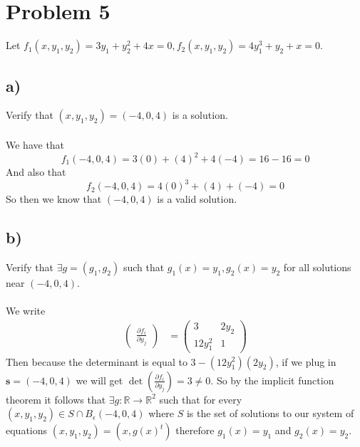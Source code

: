 \documentclass{article}
\theoremstyle{definition}
\begin{document}
\section*{Problem 5}
\begin{mdframed}[]
    Let $f_1(x,y_1,y_2) = 3y_1 +y_2^2 +4x = 0, f_2( x , y_1 , y_2 ) = 4 y^3_1 + y_2 + x = 0$.
\end{mdframed}
\subsection*{a)}
Verify that $(x,y_1,y_2) = (-4,0,4)$ is a solution.\\\\
We have that 
\[
    f_1(-4,0,4) = 3(0) + (4)^2 + 4(-4) = 16 - 16 = 0
\]
And also that 
\[
    f_2(-4,0,4) = 4(0)^3 + (4) + (-4) = 0
    \]
    So then we know that $(-4,0,4)$ is a valid solution.
\subsection*{b)}
Verify that $\exists g = (g_1,g_2)$ such that $g_1(x) = y_1, g_2(x) = y_2$ for all solutions near $(-4,0,4)$.\\\\
We write 
\begin{align*}
    \begin{pmatrix}
        \frac{\partial f_i}{\partial y_j}
    \end{pmatrix} & = \begin{pmatrix}
        3 & 2y_2\\
        12y_1^2 & 1
    \end{pmatrix}
\end{align*}
Then because the determinant is equal to $3 - (12y_1^2)(2y_2)$, if we plug in $\bm s = (-4, 0 ,4)$
we will get $\det\left(\frac{\partial f_i}{\partial y_j}\right) = 3 \neq 0$. So by the implicit function 
theorem it follows that $\exists g:\mathbb{R} \rightarrow \mathbb{R}^2$ such that for every $(x,y_1,y_2) \in S \cap B_\epsilon(-4,0,4)$
where $S$ is the set of solutions to our system of equations $(x,y_1,y_2) = (x,g(x)^t)$ therefore $g_1(x) = y_1$ and $g_2(x) = y_2$.
\end{document}
